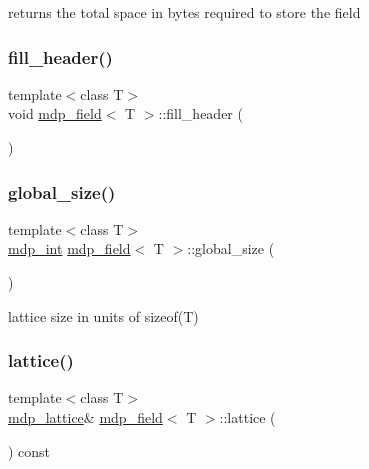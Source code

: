 returns the total space in bytes required to store the field 

\mbox{\label{classmdp__field_ad3ad6161829f9bf07fc4dd607d71e0ea}} 
\subsubsection{\texorpdfstring{fill\+\_\+header()}{fill\_header()}}
{\footnotesize\ttfamily template$<$class T$>$ \\
void \hyperlink{classmdp__field}{mdp\+\_\+field}$<$ T $>$\+::fill\+\_\+header (\begin{DoxyParamCaption}{ }\end{DoxyParamCaption})\hspace{0.3cm}{\ttfamily [inline]}}

\mbox{\label{classmdp__field_a4deb091e1da25d239e206ee8ff64ae11}} 
\subsubsection{\texorpdfstring{global\+\_\+size()}{global\_size()}}
{\footnotesize\ttfamily template$<$class T$>$ \\
\hyperlink{mdp__global__vars_8h_aaa1ad9d0dcd2124aa5af0120d9954174}{mdp\+\_\+int} \hyperlink{classmdp__field}{mdp\+\_\+field}$<$ T $>$\+::global\+\_\+size (\begin{DoxyParamCaption}{ }\end{DoxyParamCaption})\hspace{0.3cm}{\ttfamily [inline]}}



lattice size in units of sizeof(\+T) 

\mbox{\label{classmdp__field_a62ec98dec5fba14fd83549eb2693cf52}} 
\subsubsection{\texorpdfstring{lattice()}{lattice()}}
{\footnotesize\ttfamily template$<$class T$>$ \\
\hyperlink{classmdp__lattice}{mdp\+\_\+lattice}\& \hyperlink{classmdp__field}{mdp\+\_\+field}$<$ T $>$\+::lattice (\begin{DoxyParamCaption}{ }\end{DoxyParamCaption}) const\hspace{0.3cm}{\ttfamily [inline]}}



